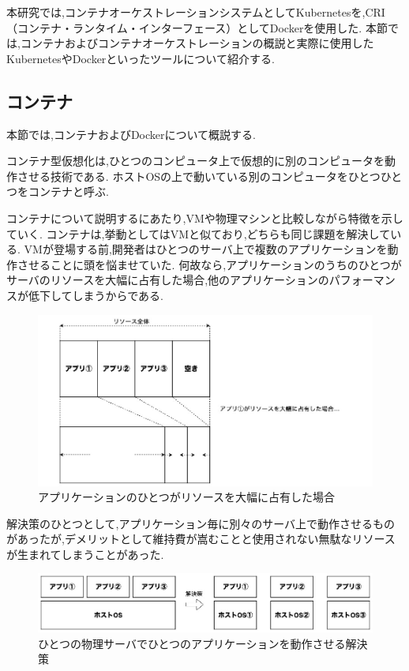 本研究では,コンテナオーケストレーションシステムとしてKubernetesを,CRI（コンテナ・ランタイム・インターフェース）としてDockerを使用した.
本節では,コンテナおよびコンテナオーケストレーションの概説と実際に使用したKubernetesやDockerといったツールについて紹介する.

\subsection{コンテナ}
\label{background:container-orchestration-system:container}

本節では,コンテナおよびDockerについて概説する.

コンテナ型仮想化は,ひとつのコンピュータ上で仮想的に別のコンピュータを動作させる技術である.
ホストOSの上で動いている別のコンピュータをひとつひとつをコンテナと呼ぶ.

コンテナについて説明するにあたり,VMや物理マシンと比較しながら特徴を示していく.
コンテナは,挙動としてはVMと似ており,どちらも同じ課題を解決している.
VMが登場する前,開発者はひとつのサーバ上で複数のアプリケーションを動作させることに頭を悩ませていた.
何故なら,アプリケーションのうちのひとつがサーバのリソースを大幅に占有した場合,他のアプリケーションのパフォーマンスが低下してしまうからである.

\begin{figure}[htbp]
\begin{center}
    \includegraphics[width=\textwidth]{./figures/resource-on-physical-server.jpg}
    \caption{アプリケーションのひとつがリソースを大幅に占有した場合}
\end{center}
\end{figure}

解決策のひとつとして,アプリケーション毎に別々のサーバ上で動作させるものがあったが,デメリットとして維持費が嵩むことと使用されない無駄なリソースが生まれてしまうことがあった.

\begin{figure}[htbp]
\begin{center}
    \includegraphics[width=\textwidth]{./figures/only-on-physical-server.jpg}
    \caption{ひとつの物理サーバでひとつのアプリケーションを動作させる解決策}
\end{center}
\end{figure}

